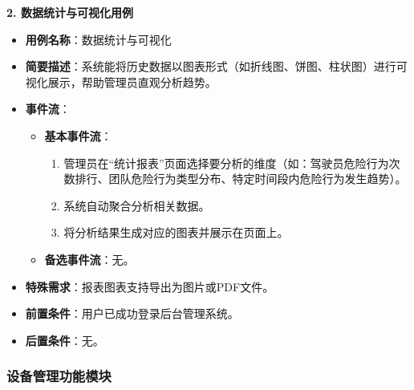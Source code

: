 \documentclass[a4paper,12pt]{article}
\begin{document}
\textbf{2. 数据统计与可视化用例}
\begin{itemize}
    \item \textbf{用例名称}：数据统计与可视化
    \item \textbf{简要描述}：系统能将历史数据以图表形式（如折线图、饼图、柱状图）进行可视化展示，帮助管理员直观分析趋势。
    \item \textbf{事件流}：
    \begin{itemize}
        \item \textbf{基本事件流}：
        \begin{enumerate}
            \item 管理员在“统计报表”页面选择要分析的维度（如：驾驶员危险行为次数排行、团队危险行为类型分布、特定时间段内危险行为发生趋势）。
            \item 系统自动聚合分析相关数据。
            \item 将分析结果生成对应的图表并展示在页面上。
        \end{enumerate}
        \item \textbf{备选事件流}：无。
    \end{itemize}
    \item \textbf{特殊需求}：报表图表支持导出为图片或PDF文件。
    \item \textbf{前置条件}：用户已成功登录后台管理系统。
    \item \textbf{后置条件}：无。
\end{itemize}

\subsubsection{设备管理功能模块}
\end{document}
